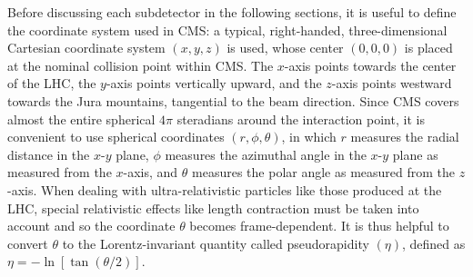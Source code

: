 Before discussing each subdetector in the following sections, it is useful to define the coordinate system used in CMS:
a typical, right-handed, three-dimensional Cartesian coordinate system $(x, y, z)$ is used, whose center $(0, 0, 0)$ is placed at the nominal \pp collision point within CMS.
The $x$-axis points towards the center of the LHC, the $y$-axis points vertically upward, and the $z$-axis points westward towards the Jura mountains, tangential to the beam direction.
Since CMS covers almost the entire spherical $4\pi$ steradians around the interaction point, it is convenient to use spherical coordinates $(r, \phi, \theta)$,
in which $r$ measures the radial distance in the $x$-$y$ plane, $\phi$ measures the azimuthal angle in the $x$-$y$ plane as measured from the $x$-axis, and $\theta$ measures the polar angle as measured from the $z$-axis.
When dealing with ultra-relativistic particles like those produced at the LHC, special relativistic effects like length contraction must be taken into account and so the coordinate $\theta$ becomes frame-dependent.
It is thus helpful to convert $\theta$ to the Lorentz-invariant quantity called pseudorapidity $(\eta)$,
defined as $\eta = -\ln [ \tan(\theta/2)]$. %
